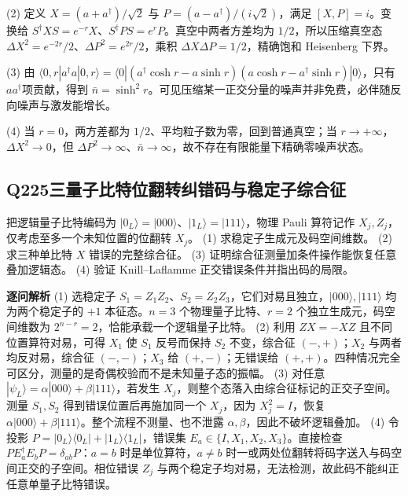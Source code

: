 (2) 定义 $X=(a+a^\dagger)/\sqrt2$ 与 $P=(a-a^\dagger)/(i\sqrt2)$，满足 $[X,P]=i$。变换给 $S^\dagger XS=e^{-r}X$、$S^\dagger PS=e^{r}P$。真空中两者方差均为 $1/2$，所以压缩真空态 $\Delta X^2=e^{-2r}/2$、$\Delta P^2=e^{2r}/2$，乘积 $\Delta X\Delta P=1/2$，精确饱和 Heisenberg 下界。

(3) 由 $\langle0,r|a^\dagger a|0,r\rangle=\langle0|(a^\dagger\cosh r-a\sinh r)(a\cosh r-a^\dagger\sinh r)|0\rangle$，只有$aa^\dagger$项贡献，得到 $\bar n=\sinh^2r$。可见压缩某一正交分量的噪声并非免费，必伴随反向噪声与激发能增长。

(4) 当 $r=0$，两方差都为 $1/2$、平均粒子数为零，回到普通真空；当 $r\to+\infty$，$\Delta X^2\to0$，但 $\Delta P^2\to\infty$、$\bar n\to\infty$，故不存在有限能量下精确零噪声状态。

\par\medskip

\subsection*{Q225\quad 三量子比特位翻转纠错码与稳定子综合征}
把逻辑量子比特编码为 $|0_L\rangle=|000\rangle$、$|1_L\rangle=|111\rangle$，物理 Pauli 算符记作 $X_j,Z_j$，仅考虑至多一个未知位置的位翻转 $X_j$。
(1) 求稳定子生成元及码空间维数。
(2) 求三种单比特 $X$ 错误的完整综合征。
(3) 证明综合征测量加条件操作能恢复任意叠加逻辑态。
(4) 验证 Knill–Laflamme 正交错误条件并指出码的局限。
\par\textbf{逐问解析}
(1) 选稳定子 $S_1=Z_1Z_2$、$S_2=Z_2Z_3$，它们对易且独立，$|000\rangle,|111\rangle$ 均为两个稳定子的 $+1$ 本征态。$n=3$ 个物理量子比特、$r=2$ 个独立生成元，码空间维数为 $2^{n-r}=2$，恰能承载一个逻辑量子比特。
(2) 利用 $ZX=-XZ$ 且不同位置算符对易，可得 $X_1$ 使 $S_1$ 反号而保持 $S_2$ 不变，综合征 $(-,+)$；$X_2$ 与两者均反对易，综合征 $(-,-)$；$X_3$ 给 $(+,-)$；无错误给 $(+,+)$。四种情况完全可区分，测量的是奇偶校验而不是未知量子态的振幅。
(3) 对任意 $|\psi_L\rangle=\alpha|000\rangle+\beta|111\rangle$，若发生 $X_j$，则整个态落入由综合征标记的正交子空间。测量 $S_1,S_2$ 得到错误位置后再施加同一个 $X_j$，因为 $X_j^2=I$，恢复 $\alpha|000\rangle+\beta|111\rangle$。整个流程不测量、也不泄露 $\alpha,\beta$，因此不破坏逻辑叠加。
(4) 令投影 $P=|0_L\rangle\langle0_L|+|1_L\rangle\langle1_L|$，错误集 $E_a\in\{I,X_1,X_2,X_3\}$。直接检查 $PE_a^\dagger E_bP=\delta_{ab}P$：$a=b$ 时是单位算符，$a\ne b$ 时一或两处位翻转将码字送入与码空间正交的子空间。相位错误 $Z_j$ 与两个稳定子均对易，无法检测，故此码不能纠正任意单量子比特错误。
\par\medskip
